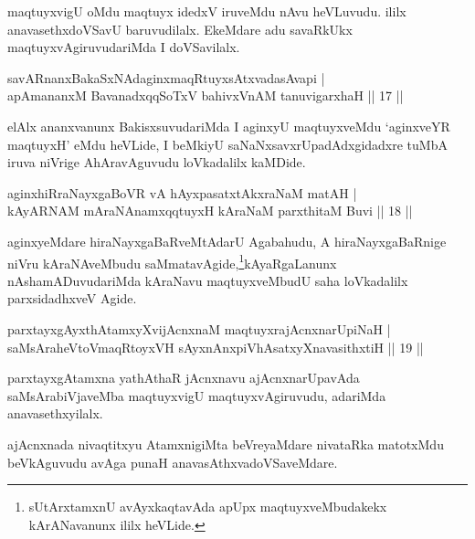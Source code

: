 \begin{artha}
maqtuyxvigU oMdu maqtuyx idedxV iruveMdu nAvu heVLuvudu. ililx anavasethxdoVSavU 
baruvudilalx. EkeMdare adu savaRkUkx maqtuyxvAgiruvudariMda I doVSavilalx.
\end{artha}

\begin{shl}
savARnanxBakaSxNAdaginxmaqRtuyxsAtxvadasAvapi |\\
apAmananxM BavanadxqqSoTxV bahivxVnAM tanuvigarxhaH \hfill || 17 ||
\end{shl}

\begin{artha}
elAlx ananxvanunx BakisxsuvudariMda I aginxyU maqtuyxveMdu `aginxveYR maqtuyxH'  eMdu heVLide, I 
beMkiyU saNaNxsavxrUpadAdxgidadxre tuMbA iruva niVrige AhAravAguvudu loVkadalilx kaMDide.
\end{artha}


\begin{shl}
aginxhiRraNayxgaBoVR vA hAyxpasatxtAkxraNaM matAH |\\
kAyARNAM mAraNAnamxqqtuyxH kAraNaM parxthitaM Buvi \hfill || 18 ||
\end{shl}

\begin{artha}
aginxyeMdare hiraNayxgaBaRveMtAdarU Agabahudu, A hiraNayxgaBaRnige niVru kAraNAveMbudu 
saMmatavAgide,\footnote{sUtArxtamxnU avAyxkaqtavAda apUpx maqtuyxveMbudakekx kArANavanunx  
ililx heVLide.}kAyaRgaLanunx nAshamADuvudariMda kAraNavu maqtuyxveMbudU saha loVkadalilx parxsidadhxveV Agide.
\end{artha}


\begin{shl}
parxtayxgAyxthAtamxyXvijAcnxnaM maqtuyxrajAcnxnarUpiNaH |\\
saMsAraheVtoVmaqRtoyxVH sAyxnAnxpiVhAsatxyXnavasithxtiH \hfill || 19 ||
\end{shl}

\begin{artha}
parxtayxgAtamxna yathAthaR jAcnxnavu ajAcnxnarUpavAda saMsArabiVjaveMba maqtuyxvigU maqtuyxvAgiruvudu, adariMda anavasethxyilalx.
\end{artha}

\begin{artha}
ajAcnxnada nivaqtitxyu AtamxnigiMta beVreyaMdare nivataRka matotxMdu beVkAguvudu avAga 
punaH anavasAthxvadoVSaveMdare.
\end{artha}

